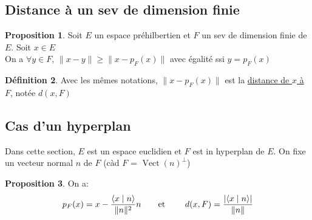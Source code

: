 \documentclass[10pt,a4paper]{article}
\theoremstyle{definition}
\newtheorem{proposition}{Proposition}[section]
\newtheorem{definition}[proposition]{Définition}
\DeclareMathOperator{\vect}{Vect}
\newcommand{\vp}[2]{\left< #1 \mid #2 \right>}
\begin{document}
\subsection{Distance à un sev de dimension finie}
\begin{proposition}
Soit $E$ un espace préhilbertien et $F$ un sev de dimension finie de $E$. Soit $x \in E$ \\
On a $\forall y \in F$, $\lVert x - y \rVert \geq \lVert x - p_F(x) \rVert$ avec égalité ssi $y = p_F(x)$
\end{proposition}
\begin{definition}
Avec les mêmes notations, $\lVert x - p_F(x) \rVert$ est la \uline{distance de $x$ à $F$}, notée $d(x, F)$
\end{definition}

\subsection{Cas d'un hyperplan}
Dans cette section, $E$ est un espace euclidien et $F$ est in hyperplan de $E$. On fixe un vecteur normal $n$ de $F$ (càd $F$ = $\vect(n)^\perp$)
\begin{proposition}
On a:
\[ p_F(x) = x - \frac{\vp{x}{n}}{\lVert n \rVert^2} n \text{\quad \quad et \quad \quad} d(x, F) = \frac{\left| \vp{x}{n} \right|}{\lVert n \rVert} \]
\end{proposition}
\end{document}
